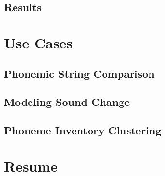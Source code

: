 \documentclass[11pt]{article}
\begin{document}
\subsection{Results}
\section{Use Cases}
\subsection{Phonemic String Comparison}
\subsection{Modeling Sound Change}
\subsection{Phoneme Inventory Clustering}
\section{Resume}



 
\end{document}
